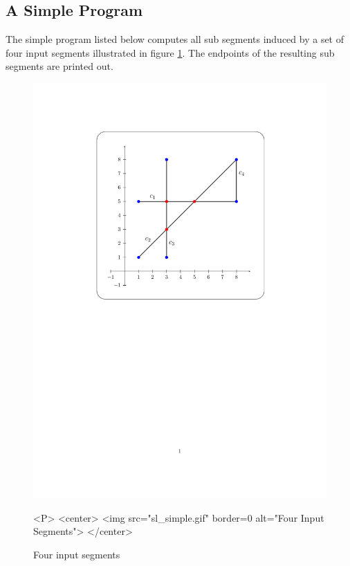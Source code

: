 \subsection{A Simple Program}
The simple program listed below computes all sub segments induced by 
a set of four input segments illustrated in figure \ref{SL_sec:simple}.
The endpoints of the resulting sub segments are printed out.

\begin{figure}[hbp]
\begin{ccTexOnly}
\centerline{\includegraphics{Sweep_line_2/sl_simple}}
\end{ccTexOnly}

\caption{Four input segments
\label{SL_sec:simple}}

\begin{ccHtmlOnly}
<P>
<center>
  <img src="sl_simple.gif" border=0 alt="Four Input Segments">
</center>
\end{ccHtmlOnly}
\end{figure}


